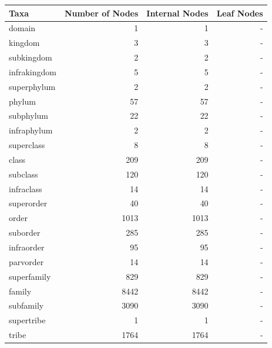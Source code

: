     \begin{table}[h!]
      \begin{center}
        \begin{tabular}{ |l|r||r|r| }
          \hline
          \bfseries Taxa & \bfseries Number of Nodes & \bfseries Internal Nodes & \bfseries Leaf Nodes \\
          \hline \hline
          \setrow{\bfseries}domain & 1        & 1 & - \\ \hline
          \setrow{\bfseries}kingdom & 3       & 3 & - \\
          subkingdom & 2                      & 2 & - \\
          infrakingdom & 5                    & 5 & - \\
          superphylum & 2                     & 2 & - \\ \hline
          \setrow{\bfseries}phylum & 57       & 57 & - \\
          subphylum & 22                      & 22 & - \\
          infraphylum & 2                     & 2 & - \\
          superclass & 8                      & 8 & - \\ \hline
          \setrow{\bfseries}class & 209       & 209 & - \\
          subclass & 120                      & 120 & - \\
          infraclass & 14                     & 14 & - \\
          superorder & 40                     & 40 & - \\ \hline
          \setrow{\bfseries}order & 1013      & 1013 & - \\
          suborder & 285                      & 285 & - \\
          infraorder & 95                     & 95 & - \\
          parvorder & 14                      & 14 & - \\
          superfamily & 829                   & 829 & - \\ \hline
          \setrow{\bfseries}family & 8442     & 8442 & - \\
          subfamily & 3090                    & 3090 & - \\
          supertribe & 1                      & 1 & - \\
          tribe & 1764                        & 1764 & - \\

\end{tabular}
\end{center}
\end{table}
